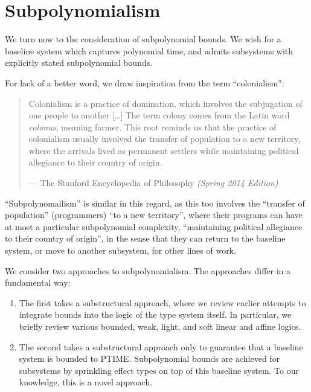 \part{Subpolynomialism}

\label{section:subpolynomialism}

We turn now to the consideration of subpolynomial bounds. We wish for a
baseline system which captures polynomial time, and admits subsystems with
explicitly stated subpolynomial bounds.

For lack of a better word, we draw inspiration from the term ``colonialism'':

\begin{quotation}

\footnotesize\sffamily\itshape

Colonialism is a practice of domination, which involves the subjugation of one
people to another [\ldots] The term colony comes from the Latin word
\emph{colonus}, meaning farmer. This root reminds us that the practice of
colonialism usually involved the transfer of population to a new territory,
where the arrivals lived as permanent settlers while maintaining political
allegiance to their country of origin.

\begin{flushright}

\upshape

--- The Stanford Encyclopedia of Philosophy \itshape (Spring 2014 Edition)

\end{flushright}

\end{quotation}

``Subpolynomailism'' is similar in this regard, as this too involves the
``transfer of population'' (programmers) ``to a new territory'', where their
programs can have at most a particular subpolynomial complexity, ``maintaining
political allegiance to their country of origin'', in the sense that they can
return to the baseline system, or move to another subsystem, for other lines of
work.

We consider two approaches to subpolynomialism. The approaches differ in a
fundamental way:

\begin{enumerate}

\item The first takes a substructural approach, where we review earlier
attempts to integrate bounds into the logic of the type system itself. In
particular, we briefly review various bounded, weak, light, and soft linear and
affine logics.

\item The second takes a substructural approach only to guarantee that a
baseline system is bounded to PTIME. Subpolynomial bounds are achieved for
subsystems by sprinkling effect types on top of this baseline system. To our
knowledge, this is a novel approach.

\end{enumerate}

